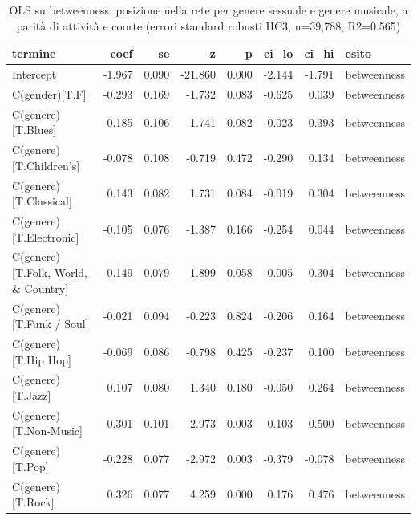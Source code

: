 \begin{table}
\centering
\caption{OLS su betweenness: posizione nella rete per genere sessuale e genere musicale, a parità di attività e coorte (errori standard robusti HC3, n=39,788, R2=0.565)}
\label{tab:t3_regressione_betweenness}
\begin{tabular}{lrrrrrrl}
\toprule
                                           termine &   coef &    se &       z &     p &  ci\_lo &  ci\_hi &       esito \\
\midrule
                                         Intercept & -1.967 & 0.090 & -21.860 & 0.000 & -2.144 & -1.791 & betweenness \\
                                    C(gender)[T.F] & -0.293 & 0.169 &  -1.732 & 0.083 & -0.625 &  0.039 & betweenness \\
                                C(genere)[T.Blues] &  0.185 & 0.106 &   1.741 & 0.082 & -0.023 &  0.393 & betweenness \\
                           C(genere)[T.Children's] & -0.078 & 0.108 &  -0.719 & 0.472 & -0.290 &  0.134 & betweenness \\
                            C(genere)[T.Classical] &  0.143 & 0.082 &   1.731 & 0.084 & -0.019 &  0.304 & betweenness \\
                           C(genere)[T.Electronic] & -0.105 & 0.076 &  -1.387 & 0.166 & -0.254 &  0.044 & betweenness \\
               C(genere)[T.Folk, World, \& Country] &  0.149 & 0.079 &   1.899 & 0.058 & -0.005 &  0.304 & betweenness \\
                          C(genere)[T.Funk / Soul] & -0.021 & 0.094 &  -0.223 & 0.824 & -0.206 &  0.164 & betweenness \\
                              C(genere)[T.Hip Hop] & -0.069 & 0.086 &  -0.798 & 0.425 & -0.237 &  0.100 & betweenness \\
                                 C(genere)[T.Jazz] &  0.107 & 0.080 &   1.340 & 0.180 & -0.050 &  0.264 & betweenness \\
                            C(genere)[T.Non-Music] &  0.301 & 0.101 &   2.973 & 0.003 &  0.103 &  0.500 & betweenness \\
                                  C(genere)[T.Pop] & -0.228 & 0.077 &  -2.972 & 0.003 & -0.379 & -0.078 & betweenness \\
                                 C(genere)[T.Rock] &  0.326 & 0.077 &   4.259 & 0.000 &  0.176 &  0.476 & betweenness \\

\end{tabular}
\end{table}
